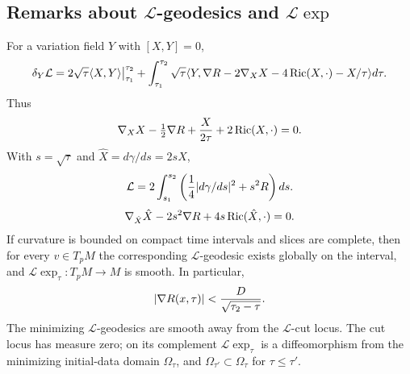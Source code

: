 \subsection{Remarks about ${\mathcal L}$-geodesics and ${\mathcal L}\exp$} \label{Lremarks}
For a variation field $Y$ with $[X,Y]=0$,
\begin{equation}\label{firstvariation}
\delta_Y{\mathcal L}=2\sqrt\tau\langle X,Y\rangle\big|_{\tau_1}^{\tau_2}
+\int_{\tau_1}^{\tau_2}\sqrt\tau\langle Y,\nabla R-2\nabla_XX-4\operatorname{Ric}(X,\cdot)-X/\tau\rangle d\tau.
\end{equation}
Thus
\begin{equation}\label{Lgeod}\nabla_XX-\tfrac12\nabla R+{X\over2\tau}+2\operatorname{Ric}(X,\cdot)=0.\end{equation}
With $s=\sqrt\tau$ and $\hat X=d\gamma/ds=2sX$,
\begin{equation}\label{changetos}
{\mathcal L}=2\int_{s_1}^{s_2}\left({1\over4}|d\gamma/ds|^2+s^2R\right)ds.
\end{equation}
\begin{equation}\label{sE-L}
\nabla_{\hat X}\hat X-2s^2\nabla R+4s\operatorname{Ric}(\hat X,\cdot)=0.
\end{equation}
If curvature is bounded on compact time intervals and slices are complete, then
for every $v\in T_pM$ the corresponding ${\mathcal L}$-geodesic exists globally on
the interval, and ${\mathcal L}\exp_\tau:T_pM\to M$ is smooth. In particular,
\begin{equation}\label{dr}|\nabla R(x,\tau)|<{D\over\sqrt{\tau_2-\tau}}.\end{equation}
The minimizing ${\mathcal L}$-geodesics are smooth away from the ${\mathcal L}$-cut locus.
The cut locus has measure zero; on its complement ${\mathcal L}\exp_\tau$ is a
diffeomorphism from the minimizing initial-data domain $\Omega_\tau$, and
$\Omega_{\tau'}\subset\Omega_\tau$ for $\tau\le\tau'$.

